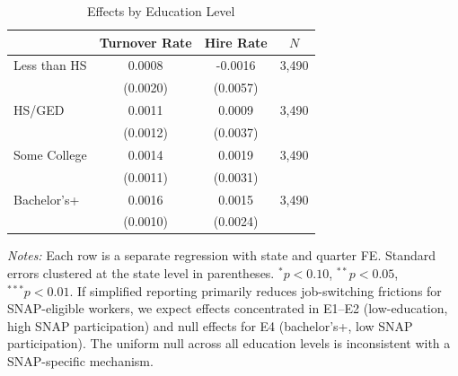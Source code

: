 \begin{table}[htbp]
\centering
\caption{Effects by Education Level}
\label{tab:education}
\begin{tabular}{lccc}
\toprule
 & Turnover Rate & Hire Rate & $N$ \\
\midrule
Less than HS & 0.0008 & -0.0016 & 3,490 \\
 & (0.0020) & (0.0057) & \\
HS/GED & 0.0011 & 0.0009 & 3,490 \\
 & (0.0012) & (0.0037) & \\
Some College & 0.0014 & 0.0019 & 3,490 \\
 & (0.0011) & (0.0031) & \\
Bachelor's+ & 0.0016 & 0.0015 & 3,490 \\
 & (0.0010) & (0.0024) & \\
\bottomrule
\end{tabular}
\begin{tablenotes}[flushleft]
\small
\item \textit{Notes:} Each row is a separate regression with state and quarter FE. Standard errors clustered at the state level in parentheses. $^{*}p<0.10$, $^{**}p<0.05$, $^{***}p<0.01$. If simplified reporting primarily reduces job-switching frictions for SNAP-eligible workers, we expect effects concentrated in E1--E2 (low-education, high SNAP participation) and null effects for E4 (bachelor's+, low SNAP participation). The uniform null across all education levels is inconsistent with a SNAP-specific mechanism.
\end{tablenotes}
\end{table}
